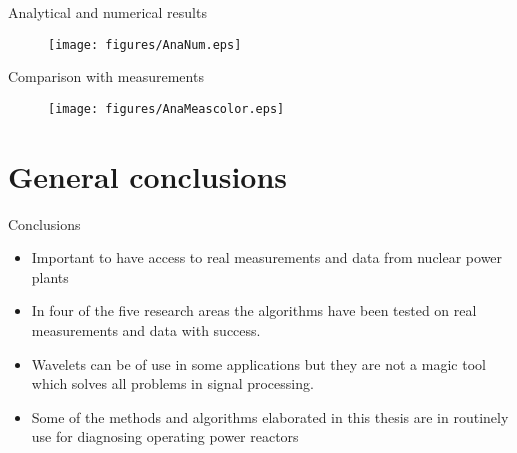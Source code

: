 \documentclass[clock,style=fyma,paper=screen,blackslide,trans=Wipe,mode=present]{powerdot}
\begin{document}
\begin{slide}{Analytical and numerical results}
\begin{figure}[htb]
\centering
\texttt{[image: figures/AnaNum.eps]}\\
\end{figure}
\end{slide}

\begin{slide}{Comparison with measurements}
\begin{figure}[htb]
\centering
\texttt{[image: figures/AnaMeascolor.eps]}\\
\end{figure}
\end{slide}

\section[slide=false]{General conclusions}
\begin{slide}{Conclusions}
\begin{itemize}
\item Important to have access to real measurements and data from
nuclear power plants\\[5mm]

\item In four of the five research areas the algorithms have been
tested on real measurements and data with success.\\[5mm]

\item Wavelets can be of use in some applications but they are not
a magic tool which solves all problems in signal processing.
\\[5mm]

\item Some of the methods and algorithms elaborated in this thesis are in routinely use for diagnosing operating power reactors\\[5mm]

\end{itemize}
\end{slide}


\end{document}
